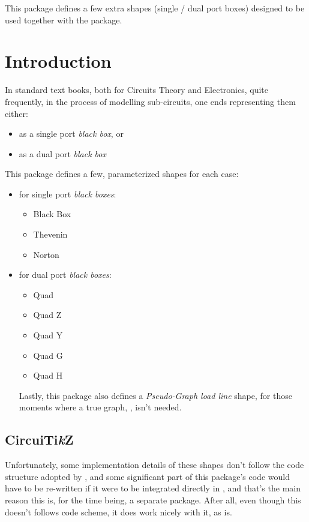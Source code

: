 \documentclass[10pt]{article}
\begin{document}
  

\begin{typesetabstract}
 
This package defines a few extra shapes (single / dual port boxes) designed to be used together with the  package.
\end{typesetabstract}

\tableofcontents

\section{Introduction}
In standard text books, both for Circuits Theory and Electronics, quite frequently, in the process of modelling sub-circuits, one ends representing them  either:
\begin{itemize}
  \item as a single port \emph{black box}, or
  \item as a dual port \emph{black box}
\end{itemize}

This package defines a few, parameterized shapes for each case:
\begin{itemize}
  \item for single port \emph{black boxes}:
  \begin{itemize}
    \item Black Box
    \item Thevenin
    \item Norton
  \end{itemize}
  \item for dual port \emph{black boxes}:
  \begin{itemize}
    \item Quad
    \item Quad Z
    \item Quad Y
    \item Quad G
    \item Quad H
  \end{itemize}
Lastly, this package also defines a \emph{Pseudo-Graph load line} shape, for those moments where a true graph, , isn't needed.
\end{itemize}
 
 \subsection{CircuiTi\emph{k}Z}
 Unfortunately, some implementation details of these shapes don't follow the code structure  adopted by , and some significant part of this package's code would have to be re-written if it were to be integrated directly in , and that's the main reason this is, for the time being, a separate package. After all, even though this doesn't follows  code scheme, it does work nicely with it, as is.
 
\end{document}
